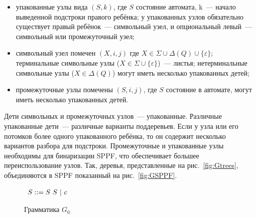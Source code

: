 \begin{itemize}
	\item упакованные узлы вида $(S, k)$, где $S$ состояние автомата, k~--- начало выведенной
	подстроки правого ребёнка; у упакованных узлов обязательно существует правый ребёнок~---
	символьный узел, и опциональный левый~--- символьный или промежуточный узел;
	\item символьный узел помечен $(X, i, j)$ где $X \in \Sigma \cup \Delta(Q) \cup \{\varepsilon\}$;
	терминальные символьные узлы ($X \in \Sigma \cup \{\varepsilon\}$)~--- листья;
	нетерминальные символьные узлы ($X \in \Delta(Q)$) могут иметь несколько упакованных детей;
	\item промежуточные узлы помечены $ (S, i, j) $, где $S$ состояние в автомате, могут иметь несколько упакованных детей.
\end{itemize}
Дети символьных и промежуточных узлов~--- упакованные. Различные упакованные дети~--- различные варианты поддеревьев.
Если у узла или его потомков более одного упакованного ребёнка, то он содержит несколько вариантов 
разбора для подстроки. Промежуточные и упакованные узлы необходимы для бинаризации SPPF, что обеспечивает большее переиспользование узлов.
Так, деревья, представленные на рис.~\ref{fig:Gtrees}, объединяются в SPPF показанный на рис.~\ref{fig:GSPPF}.
\begin{figure}
	\centering
	$
	\begin{array}[b]{rl}
	S ::= S\ S\ | \ c \ \ \ 
	\end{array}
	$
	\caption{Грамматика $G_0$}
	\label{fig:fig0}
\end{figure}
